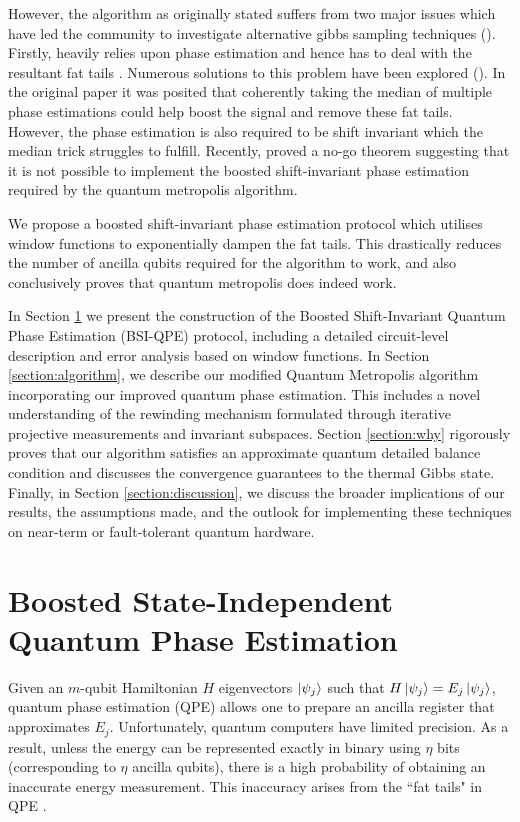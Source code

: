 \documentclass[aps,floatfix,10pt,amssymb,amsfont,amsmath,superscriptaddress,float,nofootinbib,longbibliography,nobalancelastpage,twocolumn]{revtex4-2}
\begin{document}
However, the algorithm as originally stated suffers from two major issues which have led the community to investigate alternative gibbs sampling techniques (\cite{}). Firstly, \cite{Temme_2011} heavily relies upon phase estimation and hence has to deal with the resultant fat tails \cite{}.  Numerous solutions to this problem have been explored (\cite{}). In the original paper \cite{Temme_2011} it was posited that coherently taking the median of multiple phase estimations could help boost the signal and remove these fat tails. However, the phase estimation is also required to be shift invariant which the median trick struggles to fulfill. Recently, \cite{chen2023quantumthermalstatepreparation} proved a no-go theorem suggesting that it is not possible to implement the boosted shift-invariant phase estimation required by the quantum metropolis algorithm. 

We propose a boosted shift-invariant phase estimation protocol which utilises window functions to exponentially dampen the fat tails. This drastically reduces the number of ancilla qubits required for the algorithm to work, and also conclusively proves that quantum metropolis does indeed work. 

In Section \ref{section:boostedphaseestimation} we present the construction of the Boosted Shift-Invariant Quantum Phase Estimation (BSI-QPE) protocol, including a detailed circuit-level description and error analysis based on window functions. In Section \ref{section:algorithm}, we describe our modified Quantum Metropolis algorithm incorporating our improved quantum phase estimation. This includes a novel understanding of the rewinding mechanism formulated through iterative projective measurements and invariant subspaces. Section \ref{section:why} rigorously proves that our algorithm satisfies an approximate quantum detailed balance condition and discusses the convergence guarantees to the thermal Gibbs state. Finally, in Section \ref{section:discussion}, we discuss the broader implications of our results, the assumptions made, and the outlook for implementing these techniques on near-term or fault-tolerant quantum hardware.


\section{Boosted State-Independent Quantum Phase Estimation}
\label{section:boostedphaseestimation}
Given an $m$-qubit Hamiltonian $H$ eigenvectors $\ket{\psi_j}$ such that $H\ket{\psi_j} = E_j \ket{\psi_j}$, quantum phase estimation (QPE) allows one to prepare an ancilla register that approximates $E_j$. Unfortunately, quantum computers have limited precision. As a result, unless the energy can be represented exactly in binary using $\eta$ bits (corresponding to $\eta$ ancilla qubits), there is a high probability of obtaining an inaccurate energy measurement. This inaccuracy arises from the ``fat tails" in QPE \cite{}. 
\end{document}

